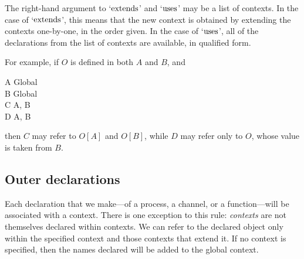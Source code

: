 \documentclass[fleqn,a4paper]{article}
\begin{document}
The right-hand argument to `$\mathrel{\mathrm{extends}}$' and `$\mathrel{\mathrm{uses}}$' may be a list of
contexts.  In the case of `$\mathrel{\mathrm{extends}}$', this means that the new
context is obtained by extending the contexts one-by-one, in the order
given.  In the case of `$\mathrel{\mathrm{uses}}$', all of the declarations from the
list of contexts are available, in qualified form.

For example, if $O$ is defined in both $A$ and $B$, and 
\begin{context}
  A \extends Global \\
  B \extends Global \\
  C \uses A, B \\
  D \extends A, B
\end{context}
then $C$ may refer to $O[A]$ and $O[B]$, while $D$ may refer only to
$O$, whose value is taken from $B$.  

\subsection{Outer declarations}

Each declaration that we make---of a process, a channel, or a
function---will be associated with a context.  There is one exception
to this rule: \emph{contexts} are not themselves declared within
contexts.  We can refer to the declared object only within the
specified context and those contexts that extend it.  If no context is
specified, then the names declared will be added to the global
context.
\end{document}
